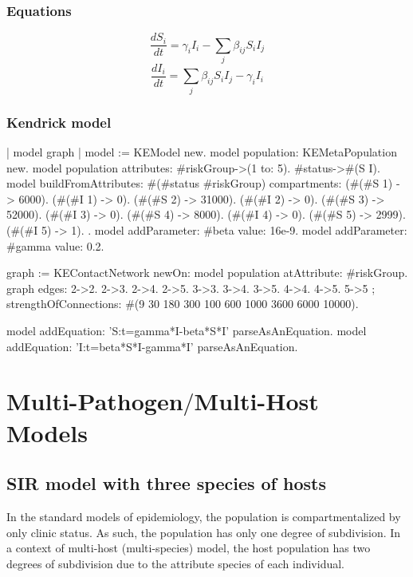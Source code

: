 \documentclass[a4paper,10pt,twoside]{book}
\begin{document}
\subsection{ Equations}

  \begin{equation}
    \frac{dS_i}{dt} = \gamma_i I_i - \sum_j \beta_{ij} S_i I_j
  \end{equation}
  \begin{equation}
    \frac{dI_i}{dt} = \sum_j \beta_{ij} S_i I_j - \gamma_i I_i
  \end{equation}
  
\subsection{ Kendrick model}

\begin{code}{}
| model graph |
	model := KEModel new.
	model population: KEMetaPopulation new.
	model population attributes: {#riskGroup->(1 to: 5). #status->#(S I)}.
	model
		buildFromAttributes: #(#status #riskGroup)
		compartments: {
		  (#(#S 1) -> 6000). (#(#I 1) -> 0).
        (#(#S 2) -> 31000). (#(#I 2) -> 0).
        (#(#S 3) -> 52000). (#(#I 3) -> 0).
        (#(#S 4) -> 8000). (#(#I 4) -> 0).
        (#(#S 5) -> 2999). (#(#I 5) -> 1).
		}.
	model addParameter: #beta value: 16e-9.
	model addParameter: #gamma value: 0.2.

	graph := KEContactNetwork
					newOn: model population
					atAttribute: #riskGroup.
	graph edges: { 2->2. 2->3. 2->4. 2->5. 3->3. 3->4. 3->5. 4->4. 4->5. 5->5 };
			strengthOfConnections: #(9 30 180 300 100 600 1000 3600 6000 10000).

	model addEquation: 'S:t=gamma*I-beta*S*I' parseAsAnEquation.
	model addEquation: 'I:t=beta*S*I-gamma*I' parseAsAnEquation.
\end{code}

\chapter{ Multi-Pathogen$/$Multi-Host Models}\section{ SIR model with three species of hosts}
In the standard models of epidemiology, the population is compartmentalized by only clinic status.
As such, the population has only one degree of subdivision.
In a context of multi-host (multi-species) model, the host population has two degrees of subdivision due to the attribute species of each individual.
\end{document}
